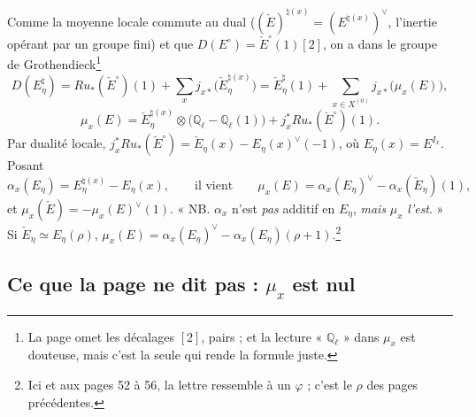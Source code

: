 \documentclass[11pt,a4paper]{article}
\begin{document}
Comme la moyenne locale commute au dual ($(\check E)^{\natural(x)} =
(E^{\natural(x)})^{\vee}$, l'inertie opérant par un groupe fini) et que
$D(E^{\circ}) = \check E^{\circ}(1)[2]$, on a dans le groupe de
Grothendieck\footnote{La page omet les décalages $[2]$, pairs ; et la lecture
« $\mathbb{Q}_\ell$ » dans $\mu_x$ est douteuse, mais c'est la seule qui rende
la formule juste.}
\[
  D(E_\eta^{\natural}) = Ru_{*}(\check E^{\circ})(1) + \sum_x j_{x*}\bigl(\check E_\eta^{\natural(x)}\bigr)
  = \check E_\eta^{\natural}(1) + \sum_{x \in X^{(0)}} j_{x*}\bigl(\mu_x(E)\bigr),
\]
\[
  \mu_x(E) = \check E_\eta^{\natural(x)} \otimes \bigl(\mathbb{Q}_\ell - \mathbb{Q}_\ell(1)\bigr)
           + j_x^{*}Ru_{*}(\check E^{\circ})(1).
\]
Par dualité locale, $j_x^{*}Ru_{*}(\check E^{\circ}) = \check E_\eta(x) -
E_\eta(x)^{\vee}(-1)$, où $E_\eta(x) = E^{I_x}$. Posant
\[
  \alpha_x(E_\eta) = E_\eta^{\natural(x)} - E_\eta(x),
  \qquad\text{il vient}\qquad
  \mu_x(E) = \alpha_x(E_\eta)^{\vee} - \alpha_x(\check E_\eta)(1),
\]
et $\mu_x(\check E) = -\mu_x(E)^{\vee}(1)$. « NB. $\alpha_x$ n'est \emph{pas}
additif en $E_\eta$, \emph{mais} $\mu_x$ \emph{l'est}. » Si
$\check E_\eta \simeq E_\eta(\rho)$,
$\mu_x(E) = \alpha_x(E_\eta)^{\vee} - \alpha_x(E_\eta)(\rho + 1)$.\footnote{Ici
et aux pages 52 à 56, la lettre ressemble à un $\varphi$ ; c'est le $\rho$
des pages précédentes.}

\subsection*{Ce que la page ne dit pas : $\mu_x$ est nul}
\end{document}

